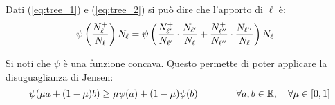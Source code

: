 Dati (\ref{eq:tree_1}) e (\ref{eq:tree_2}) si può dire che l'apporto di $\ell$ è:
\begin{align}
    \psi \left(\frac{N_{\ell}^+}{N_{\ell}}\right)N_{\ell} &=
        \psi \left(
            \frac{N_{\ell'}^+}{N_{\ell'}}\cdot\frac{N_{\ell'}}{N_{\ell}}
            +\frac{N_{\ell''}^+}{N_{\ell''}}\cdot\frac{N_{\ell''}}{N_{\ell}}
        \right)N_{\ell} 
\end{align}

Si noti che $\psi$ è una funzione concava. Questo permette di poter applicare la disuguaglianza di Jensen:
\begin{equation} \psi(\mu a + (1-\mu)b) \geq \mu\psi(a)+(1-\mu)\psi(b) \qquad\qquad \forall
a,b \in \mathbb{R}, \quad \forall \mu \in [0,1] \label{eq:tree_jensen} \end{equation}

